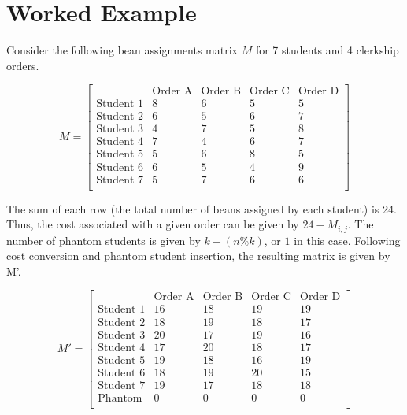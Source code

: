 \documentclass{article}
\begin{document}
\section{Worked Example}
Consider the following bean assignments matrix $M$ for 7 students and 4 clerkship orders.

$$M = 
\begin{bmatrix}
    & \text{Order A} & \text{Order B} & \text{Order C} & \text{Order D} \\
\text{Student 1} & 8 & 6 & 5 & 5 \\
\text{Student 2} & 6 & 5 & 6 & 7 \\
\text{Student 3} & 4 & 7 & 5 & 8 \\
\text{Student 4} & 7 & 4 & 6 & 7 \\
\text{Student 5} & 5 & 6 & 8 & 5 \\
\text{Student 6} & 6 & 5 & 4 & 9 \\
\text{Student 7} & 5 & 7 & 6 & 6 \\
\end{bmatrix}$$

The sum of each row (the total number of beans assigned by each student) is 24. Thus, the cost associated with a given order can be given by $24 - M_{i,j}$. The number of phantom students is given by $k-(n \% k)$, or $1$ in this case. Following cost conversion and phantom student insertion, the resulting matrix is given by M'. 

$$M' = 
\begin{bmatrix}
    & \text{Order A} & \text{Order B} & \text{Order C} & \text{Order D} \\
\text{Student 1} & 16 & 18 & 19 & 19 \\
\text{Student 2} & 18 & 19 & 18 & 17 \\
\text{Student 3} & 20 & 17 & 19 & 16 \\
\text{Student 4} & 17 & 20 & 18 & 17 \\
\text{Student 5} & 19 & 18 & 16 & 19 \\
\text{Student 6} & 18 & 19 & 20 & 15 \\
\text{Student 7} & 19 & 17 & 18 & 18 \\
\text{Phantom} & 0 & 0 & 0 & 0 \\
\end{bmatrix}
$$
\end{document}
